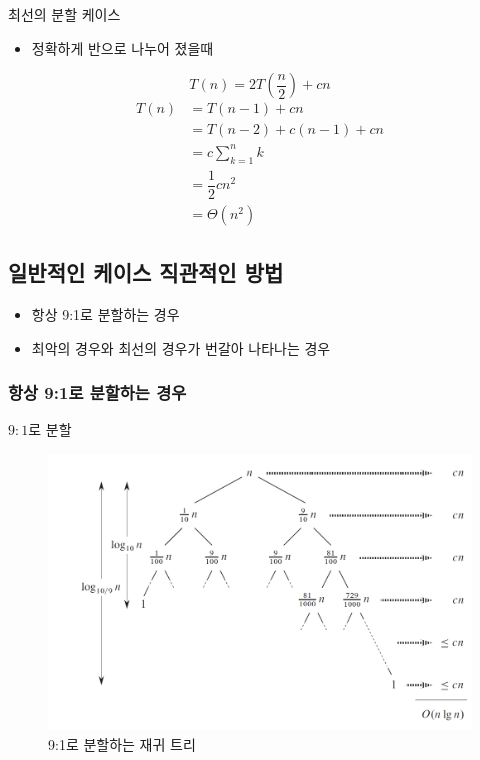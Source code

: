 \documentclass[10pt]{beamer}
\begin{document}
\begin{frame}{최선의 분할 케이스}
    \pause
    \begin{itemize}
        \item 정확하게 반으로 나누어 졌을때
    \end{itemize}
    \pause
    $$T(n) = 2T\left( \dfrac{n}{2}  \right) + cn $$
    \pause
    \begin{align*}
        T(n) &= T(n-1) + cn \\
        &= T(n-2) + c(n-1) +cn \\
        &= c\sum^{n}_{k=1}k \\
        &= \dfrac{1}{2} cn^{2}\\
        &= \Theta (n^{2})    
    \end{align*}
\end{frame}

\subsection{일반적인 케이스 직관적인 방법} 
\begin{frame}
    \begin{itemize}
        \item 항상 9:1로 분할하는 경우
        \item 최악의 경우와 최선의 경우가 번갈아 나타나는 경우
    \end{itemize}
\end{frame}

\subsubsection{항상 9:1로 분할하는 경우}

\begin{frame}{$9:1$로 분할}
    \begin{figure}[h!]
        \raggedleft
        \includegraphics[scale=0.3]{./QuickSort/pic/q9.png}
        \caption{9:1로 분할하는 재귀 트리\cite{reference1}}
    \end{figure}
\end{frame}
\end{document}
